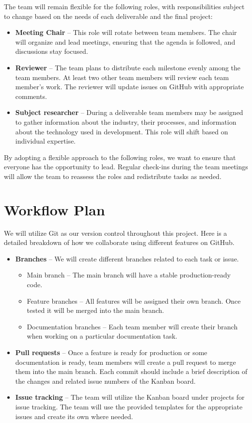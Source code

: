 \documentclass{article}
\begin{document}
The team will remain flexible for the following roles, with responsibilities subject to change based on the needs of each deliverable and the final project:
\begin{itemize}
\item \textbf{Meeting Chair} -- This role will rotate between team members. The chair will organize and lead meetings, ensuring that the agenda is followed, and discussions stay focused.
\item \textbf{Reviewer} -- The team plans to distribute each milestone evenly among the team members. At least two other team members will review each team member’s work. The reviewer will update issues on GitHub with appropriate comments.
\item \textbf{Subject researcher} -- During a deliverable team members may be assigned to gather information about the industry, their processes, and information about the technology used in development. This role will shift based on individual expertise.
\end{itemize}
By adopting a flexible approach to the following roles, we want to ensure that everyone has the opportunity to lead. Regular check-ins during the team meetings will allow the team to reassess the roles and redistribute tasks as needed. 


\section{Workflow Plan}

We will utilize Git as our version control throughout this project. Here is a detailed breakdown of how we collaborate using different features on GitHub. 

\begin{itemize}
\item \textbf{Branches} -- We will create different branches related to each task or issue. 
\begin{itemize}
\item Main branch -- The main branch will have a stable production-ready code. 
\item Feature branches -- All features will be assigned their own branch. Once tested it will be merged into the main branch.
\item Documentation branches -- Each team member will create their branch when working on a particular documentation task. 
\end{itemize}

\item \textbf{Pull requests} -- Once a feature is ready for production or some documentation is ready, team members will create a pull request to merge them into the main branch. Each commit should include a brief description of the changes and related issue numbers of the Kanban board.

\item \textbf{Issue tracking} -- The team will utilize the Kanban board under projects for issue tracking. The team will use the provided templates for the appropriate issues and create its own where needed. 
\end{itemize}
\end{document}

